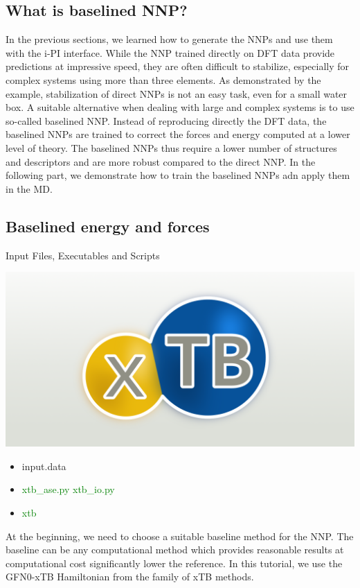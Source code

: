 \documentclass[12pt]{article}
\begin{document}
\subsection{What is baselined NNP?}
In the previous sections, we learned how to generate the NNPs and use them with the i-PI interface. While the NNP trained directly on DFT data provide predictions at impressive speed, they are often difficult to stabilize, especially for complex systems using more than three elements. As demonstrated by the example, stabilization of direct NNPs is not an easy task, even for a small water box. 
A suitable alternative when dealing with large and complex systems is to use so-called baselined NNP.\cite{ramakrishnan2015big} Instead of reproducing directly the DFT data, the baselined NNPs are trained to correct the forces and energy computed at a lower level of theory. The baselined NNPs thus require a lower number of structures and descriptors and are more robust compared to the direct NNP. In the following part, we demonstrate how to train the baselined NNPs adn apply them in the MD.
%
\subsection{Baselined energy and forces}
\begin{mybox2}{{Input Files, Executables and Scripts}}
\begin{minipage}[c]{0.5\linewidth}
\includegraphics[scale=0.15]{latex_files/xtb.png}
\end{minipage}
\begin{minipage}[c]{0.5\linewidth}
\begin{itemize}
    \item input.data
    \item \textcolor{green}{xtb\_ase.py xtb\_io.py}
     
    \item \textcolor{green}{xtb}
\end{itemize}
\end{minipage}
\end{mybox2}
At the beginning, we need to choose a suitable baseline method for the NNP. The baseline can be any computational method which provides reasonable results at computational cost significantly lower the reference. In this tutorial, we use the GFN0-xTB Hamiltonian from the family of xTB methods.\cite{https://doi.org/10.1002/wcms.1493} 
\end{document}

